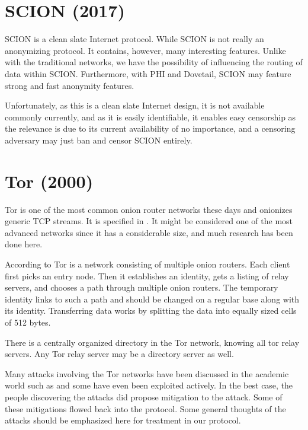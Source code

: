 \section{SCION (2017)}
SCION\cite{perrig2017scion} is a clean slate Internet protocol. While SCION is not really an anonymizing protocol. It contains, however,  many interesting features. Unlike with the traditional networks, we have the possibility of influencing the routing of data within SCION. Furthermore, with PHI\cite{chen2017phi} and Dovetail\cite{sankey2014dovetail}, SCION may feature strong and fast anonymity features. 

Unfortunately, as this is a clean slate Internet design, it is not available commonly currently, and as it is easily identifiable, it enables easy censorship as the relevance is due to its current availability of no importance, and a censoring adversary may just ban and censor SCION entirely. 


\section{Tor (2000)\label{sec:tor}}
Tor is one of the most common onion router networks these days and onionizes generic TCP streams. It is specified in \cite{tor-spec}. It might be considered one of the most advanced networks since it has a considerable size, and much research has been done here.

According to \cite{onion-routing:pet2000} Tor is a network consisting of multiple onion routers. Each client first picks an entry node. Then it establishes an identity, gets a listing of relay servers, and chooses a path through multiple onion routers. The temporary identity links to such a path and should be changed on a regular base along with its identity. Transferring data works by splitting the data into equally sized cells of 512 bytes.

There is a centrally organized directory in the Tor network, knowing all tor relay servers. Any Tor relay server may be a directory server as well. 

Many attacks involving the Tor networks have been discussed in the academic world such as \cite{hs-attack06,esorics13-cellflood,bauer:wpes2007,esorics12-torscan,oakland2013-trawling,danner-et-al:tissec12,congestion-longpaths} and some have even been exploited actively. In the best case, the people discovering the attacks did propose mitigation to the attack. Some of these mitigations flowed back into the protocol. Some general thoughts of the attacks should be emphasized here for treatment in our protocol.

